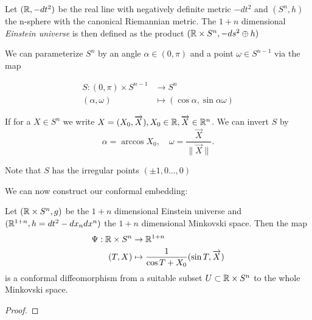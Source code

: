 \begin{definition}
Let $(\mathbb{R},-dt^2)$ be the real line with negatively definite metric $-dt^2$ and $(S^n,h)$ the n-sphere with the canonical Riemannian metric. The $1+n$ dimensional \emph{Einstein universe} is then defined as the product $(\mathbb{R}\times S^n, -ds^2 \oplus h)$
\end{definition}

\begin{remark}
We can parameterize $S^n$ by an angle $\alpha\in (0,\pi)$ and a point $\omega\in S^{n-1}$ via the map 

\begin{align*}
    S:(0,\pi)\times S^{n-1}&\to S^n \\
    (\alpha,\omega) &\mapsto (\cos \alpha, \sin \alpha \omega)
\end{align*}

If for a $X\in S^n$ we write $X=(X_0,\overrightarrow{X}), X_0\in \mathbb{R}, \overrightarrow{X}\in \mathbb{R}^n$. We can invert $S$ by 
\[
    \alpha = \arccos X_0, \quad \omega=\frac{\overrightarrow{X}}{\lVert\overrightarrow{X}\rVert}.
\]

Note that $S$ has the irregular points $(\pm 1,0\dots,0)$
\end{remark}

We can now construct our conformal embedding:

\begin{proposition}
Let $(\mathbb{R}\times S^n,g)$ be the $1+n$ dimensional Einstein universe and $(\mathbb{R}^{1+n},h=dt^2-dx_ndx^n)$ the $1+n$ dimensional Minkovski space. Then the map 
\begin{align}
    \Psi:\mathbb{R}\times S^n &\to \mathbb{R}^{1+n}\\
    (T,X) &\mapsto\frac{1}{\cos T + X_0}(\sin T,\overrightarrow{X})
\end{align}
is a conformal diffeomorphism from a suitable subset $U\subset \mathbb{R}\times S^n$ to the whole Minkovski space.
\end{proposition}
\begin{proof}
\end{proof}
